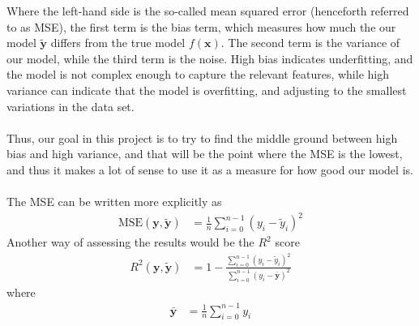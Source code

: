 \documentclass[a4paper]{article}
\newcommand{\xx}{\mathbf{x}}
\newcommand{\yy}{\bm{\tilde y}}
\begin{document}
Where the left-hand side is the so-called mean squared error (henceforth referred to as MSE), the first term is the bias term, which measures how much the our model $\yy$ differs from the true model $f(\xx)$. The second term is the variance of our model, while the third term is the noise. High bias indicates underfitting, and the model is not complex enough to capture the relevant features, while high variance can indicate that the model is overfitting, and adjusting to the smallest variations in the data set.\\\\
Thus, our goal in this project is to try to find the middle ground between high bias and high variance, and that will be the point where the MSE is the lowest, and thus it makes a lot of sense to use it as a measure for how good our model is.
\\\\
The MSE can be written more explicitly as
\begin{align*}
\text{MSE}(\bm{y},\yy) &= \frac{1}{n}\sum_{i=0}^{n-1}(y_i-\tilde y_i)^2 
\end{align*}
Another way of assessing the results would be the $R^2$ score
\begin{align*}
R^2(\bm{y},\yy) &= 1-\frac{\sum_{i=0}^{n-1}(y_i - \tilde y_i)^2}{\sum_{i=0}^{n-1}(y_i - \bar{\bm{y}})^2}
\end{align*}
where
\begin{align*}
\bar{\bm{y}} &= \frac{1}{n}\sum_{i=0}^{n-1}y_i
\end{align*}
\end{document}
